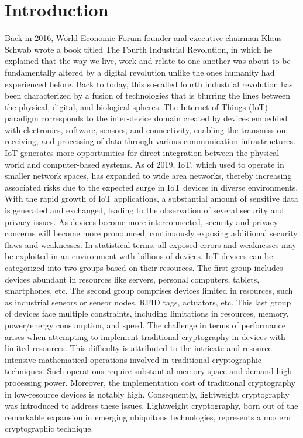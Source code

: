 \documentclass[conference,compsoc]{IEEEtran}
\begin{document}
\section{Introduction}
Back in 2016, World Economic Forum founder and executive chairman Klaus Schwab wrote a book titled The Fourth Industrial Revolution, in which he explained that the way we live, work and relate to one another was about to be fundamentally altered by a digital revolution unlike the ones humanity had experienced before. Back to today, this so-called fourth industrial revolution has been characterized by a fusion of technologies that is blurring the lines between the physical, digital, and biological spheres\cite{WorldEconomicForum}.
The Internet of Things (IoT) paradigm corresponds to the inter-device domain created by devices embedded with electronics, software, sensors, and connectivity, enabling the transmission, receiving, and processing of data through various communication infrastructures. IoT generates more opportunities for direct integration between the physical world and computer-based systems.
As of 2019, IoT, which used to operate in smaller network spaces, has expanded to wide area networks, thereby increasing associated risks due to the expected surge in IoT devices in diverse environments. With the rapid growth of IoT applications, a substantial amount of sensitive data is generated and exchanged, leading to the observation of several security and privacy issues. As devices become more interconnected, security and privacy concerns will become more pronounced, continuously exposing additional security flaws and weaknesses. In statistical terms, all exposed errors and weaknesses may be exploited in an environment with billions of devices.
IoT devices can be categorized into two groups based on their resources. The first group includes devices abundant in resources like servers, personal computers, tablets, smartphones, etc. The second group comprises devices limited in resources, such as industrial sensors or sensor nodes, RFID tags, actuators, etc.
This last group of devices face multiple constraints, including limitations in resources, memory, power/energy consumption, and speed. The challenge in terms of performance arises when attempting to implement traditional cryptography in devices with limited resources. This difficulty is attributed to the intricate and resource-intensive mathematical operations involved in traditional cryptographic techniques. Such operations require substantial memory space and demand high processing power. Moreover, the implementation cost of traditional cryptography in low-resource devices is notably high. Consequently, lightweight cryptography was introduced to address these issues. Lightweight cryptography, born out of the remarkable expansion in emerging ubiquitous technologies, represents a modern cryptographic technique.
\end{document}
